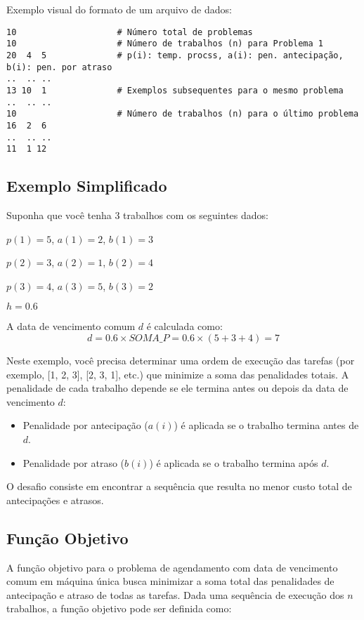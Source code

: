 \documentclass[12pt]{article}
\begin{document}
Exemplo visual do formato de um arquivo de dados:

\begin{verbatim}
10                    # Número total de problemas
10                    # Número de trabalhos (n) para Problema 1
20  4  5              # p(i): temp. procss, a(i): pen. antecipação, b(i): pen. por atraso
..  .. ..
13 10  1              # Exemplos subsequentes para o mesmo problema
..  .. ..
10                    # Número de trabalhos (n) para o último problema
16  2  6
..  .. ..
11  1 12
\end{verbatim}

\subsection{Exemplo Simplificado}

Suponha que você tenha 3 trabalhos com os seguintes dados:  

$p(1) = 5$, $a(1) = 2$, $b(1) = 3$  

$p(2) = 3$, $a(2) = 1$, $b(2) = 4$  

$p(3) = 4$, $a(3) = 5$, $b(3) = 2$  

$h = 0.6$

A data de vencimento comum $d$ é calculada como:  
\[
d = 0.6 \times SOMA\_P = 0.6 \times (5 + 3 + 4) = 7
\]

Neste exemplo, você precisa determinar uma ordem de execução das tarefas (por exemplo, [1, 2, 3], [2, 3, 1], etc.) que minimize a soma das penalidades totais. A penalidade de cada trabalho depende se ele termina antes ou depois da data de vencimento $d$:
\begin{itemize}
    \item Penalidade por antecipação ($a(i)$) é aplicada se o trabalho termina antes de $d$.
    \item Penalidade por atraso ($b(i)$) é aplicada se o trabalho termina após $d$.
\end{itemize}
O desafio consiste em encontrar a sequência que resulta no menor custo total de antecipações e atrasos.

\subsection{Função Objetivo} \label{subsec:funcao_objetivo}

A função objetivo para o problema de agendamento com data de vencimento comum em máquina única busca minimizar a soma total das penalidades de antecipação e atraso de todas as tarefas. Dada uma sequência de execução dos $n$ trabalhos, a função objetivo pode ser definida como:
\end{document}
